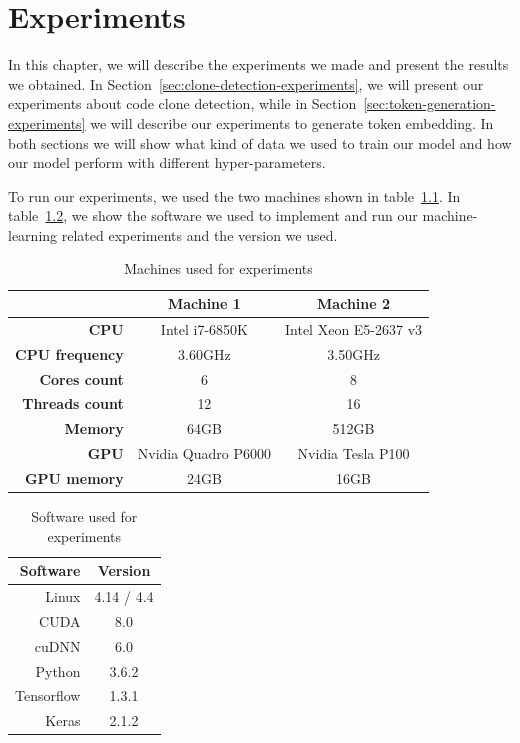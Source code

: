 \chapter{\label{ch:experiments}Experiments}
In this chapter, we will describe the experiments we made and present the
results we obtained. In Section~\ref{sec:clone-detection-experiments}, we will
present our experiments about code clone detection, while in
Section~\ref{sec:token-generation-experiments} we will describe our experiments
to generate token embedding. In both sections we will show what kind of data we
used to train our model and how our model perform with different
hyper-parameters.

To run our experiments, we used the two machines shown in
table~\ref{tab:machine-specs}. In table~\ref{tab:softwares}, we show the
software we used to implement and run our machine-learning related experiments
and the version we used.

\begin{table}
  \caption{\label{tab:machine-specs}Machines used for experiments}
  \begin{center}
    \begin{tabular}{r c c}
      \toprule
       & Machine 1 & Machine 2\\
      \toprule
      \textbf{CPU} & Intel i7-6850K & Intel Xeon E5-2637 v3\\
      \textbf{CPU frequency} & 3.60GHz & 3.50GHz\\
      \textbf{Cores count} & 6 & 8\\
      \textbf{Threads count} & 12 & 16\\
      \textbf{Memory} & 64GB & 512GB\\
      \textbf{GPU} & Nvidia Quadro P6000 & Nvidia Tesla P100\\
      \textbf{GPU memory} & 24GB & 16GB\\
      \bottomrule
    \end{tabular}
  \end{center}
\end{table}
%
\begin{table}
  \caption{\label{tab:softwares}Software used for experiments}
  \begin{center}
    \begin{tabular}{r c}
      \toprule
       Software & Version\\
      \toprule
      Linux & 4.14 / 4.4\\
      CUDA & 8.0\\
      cuDNN & 6.0\\
      Python & 3.6.2\\
      Tensorflow & 1.3.1\\
      Keras & 2.1.2\\
      \bottomrule
    \end{tabular}
  \end{center}
\end{table}
